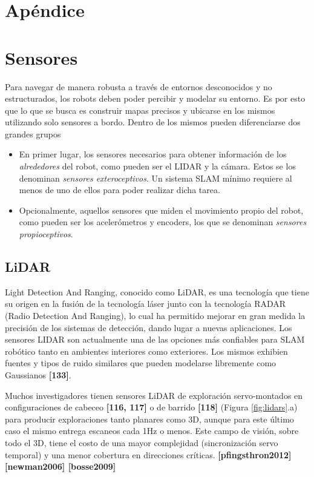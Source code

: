 \ifimagenes
\section*{Apéndice}
\else
\section{Sensores}
\label{sec:sensors}
\fi
Para navegar de manera robusta a través de entornos desconocidos y no estructurados, los robots deben poder percibir y modelar su entorno. Es por esto que lo que se busca es construir mapas precisos y ubicarse en los mismos utilizando solo sensores a bordo. Dentro de los mismos pueden diferenciarse dos grandes grupos
\begin{itemize}
    \item En primer lugar, los sensores necesarios para obtener información de los \textit{alrededores} del robot, como pueden ser el LIDAR y la cámara. Estos se los denominan \textit{sensores exteroceptivos}. Un sistema SLAM mínimo requiere al menos de uno de ellos para poder realizar dicha tarea.
    \item Opcionalmente, aquellos sensores que miden el movimiento propio del robot, como pueden ser los acelerómetros y encoders, los que se denominan \textit{sensores propioceptivos}.
\end{itemize}

\ifimagenes
\else
\subsection{LiDAR}
Light Detection And Ranging, conocido como LiDAR, es una tecnología que tiene su origen en la fusión de la tecnología láser junto con la tecnología RADAR (Radio Detection And Ranging), lo cual ha permitido mejorar en gran medida la precisión de los sistemas de detección, dando lugar a nuevas aplicaciones. Los sensores LIDAR son actualmente una de las opciones más confiables para SLAM robótico tanto en ambientes interiores como exteriores. Los mismos exhibien fuentes y tipos de ruido similares que pueden modelarse libremente como Gaussianos \textbf{[133]}.

Muchos investigadores tienen sensores LiDAR de exploración servo-montados en configuraciones de cabeceo \textbf{[116, 117]} o de barrido \textbf{[118]} (Figura \ref{fig:lidars}.a) para producir exploraciones tanto planares como 3D, aunque para este último caso el mismo entrega escaneos cada 1Hz o menos. Este campo de visión, sobre todo el 3D, tiene el costo de una mayor complejidad (sincronización servo temporal) y una menor cobertura en direcciones críticas.
\textbf{[pfingsthron2012] [newman2006] [bosse2009]}

